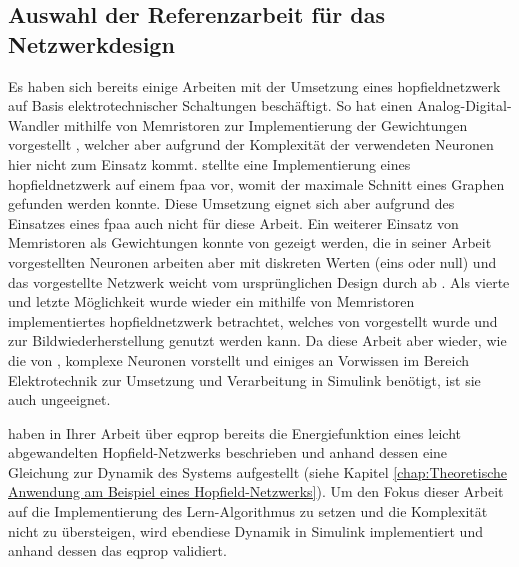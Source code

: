 \subsection{Auswahl der Referenzarbeit für das Netzwerkdesign}
\label{chap:Auswahl der Referenzarbeit für das Netzwerkdesign}

Es haben sich bereits einige Arbeiten mit der Umsetzung eines \gls{hopfieldnetzwerk} auf Basis elektrotechnischer Schaltungen beschäftigt. So hat \zb \citeauthor{Guo2015} einen Analog-Digital-Wandler mithilfe von Memristoren zur Implementierung der Gewichtungen vorgestellt \cite{Guo2015}, welcher aber aufgrund der Komplexität der verwendeten Neuronen hier nicht zum Einsatz kommt. \citeauthor{Mathews2023} stellte \citeyear{Mathews2023} eine Implementierung eines \gls{hopfieldnetzwerk} auf einem \gls{fpaa} vor, womit der maximale Schnitt eines Graphen gefunden werden konnte. Diese Umsetzung eignet sich aber aufgrund des Einsatzes eines \gls{fpaa} auch nicht für diese Arbeit. Ein weiterer Einsatz von Memristoren als Gewichtungen konnte von \citeauthor{Hu2015} gezeigt werden, die in seiner Arbeit vorgestellten Neuronen arbeiten aber mit diskreten Werten (eins oder null) und das vorgestellte Netzwerk weicht vom ursprünglichen Design durch \citeauthor{Hopfield1982} ab \cite{Hu2015}. Als vierte und letzte Möglichkeit wurde wieder ein mithilfe von Memristoren implementiertes \gls{hopfieldnetzwerk} betrachtet, welches \citeyear{Hong2020} von \citeauthor{Hong2020} vorgestellt wurde und zur Bildwiederherstellung genutzt werden kann. Da diese Arbeit aber wieder, wie die von \cite{Guo2015}, komplexe Neuronen vorstellt und einiges an Vorwissen im Bereich Elektrotechnik zur Umsetzung und Verarbeitung in Simulink benötigt, ist sie auch ungeeignet.

\citeauthor{Scellier2017} haben in Ihrer Arbeit über \gls{eqprop} bereits die Energiefunktion eines leicht abgewandelten Hopfield-Netzwerks beschrieben und anhand dessen eine Gleichung zur Dynamik des Systems aufgestellt (siehe Kapitel \ref{chap:Theoretische Anwendung am Beispiel eines Hopfield-Netzwerks}). Um den Fokus dieser Arbeit auf die Implementierung des Lern-Algorithmus zu setzen und die Komplexität nicht zu übersteigen, wird ebendiese Dynamik in Simulink implementiert und anhand dessen das \gls{eqprop} validiert.
